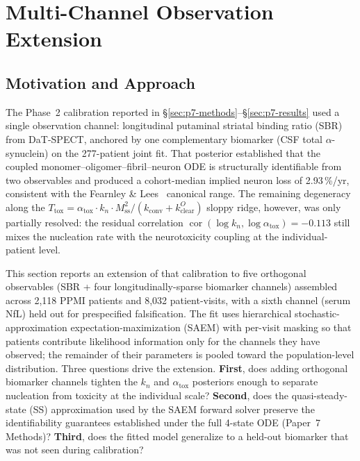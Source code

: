 
\section{Multi-Channel Observation Extension}
\label{sec:ch9-6}

\subsection{Motivation and Approach}
\label{subsec:ch9-6-motivation}

The Phase~2 calibration reported in \S\ref{sec:p7-methods}--\S\ref{sec:p7-results} used a single observation channel: longitudinal putaminal striatal binding ratio (SBR) from DaT-SPECT, anchored by one complementary biomarker (CSF total $\alpha$-synuclein) on the 277-patient joint fit. That posterior established that the coupled monomer--oligomer--fibril--neuron ODE is structurally identifiable from two observables and produced a cohort-median implied neuron loss of 2.93\,\%/yr, consistent with the Fearnley \& Lees~\cite{fearnley1991} canonical range. The remaining degeneracy along the $T_\text{tox} = \alpha_\text{tox} \cdot k_n \cdot M_\text{ss}^2 / (k_\text{conv} + k_\text{clear}^O)$ sloppy ridge, however, was only partially resolved: the residual correlation $\operatorname{cor}(\log k_n, \log \alpha_\text{tox}) = -0.113$ still mixes the nucleation rate with the neurotoxicity coupling at the individual-patient level.

This section reports an extension of that calibration to five orthogonal observables (SBR + four longitudinally-sparse biomarker channels) assembled across 2,118 PPMI patients and 8,032 patient-visits, with a sixth channel (serum NfL) held out for prespecified falsification. The fit uses hierarchical stochastic-approximation expectation-maximization (SAEM) with per-visit masking so that patients contribute likelihood information only for the channels they have observed; the remainder of their parameters is pooled toward the population-level distribution. Three questions drive the extension. \textbf{First}, does adding orthogonal biomarker channels tighten the $k_n$ and $\alpha_\text{tox}$ posteriors enough to separate nucleation from toxicity at the individual scale? \textbf{Second}, does the quasi-steady-state (SS) approximation used by the SAEM forward solver preserve the identifiability guarantees established under the full 4-state ODE (Paper~7 Methods)? \textbf{Third}, does the fitted model generalize to a held-out biomarker that was not seen during calibration?

